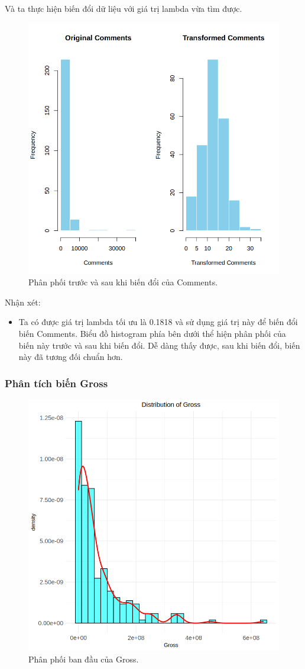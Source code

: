 Và ta thực hiện biến đổi dữ liệu với giá trị lambda vừa tìm được.
\begin{figure}[H]
    \centering
    \includegraphics[width=0.75\columnwidth]{csm_figures/comments_transformed_distribution.png}
    \caption{Phân phối trước và sau khi biến đổi của Comments.}
    \label{fig:comments_transformed_distribution}
\end{figure}
Nhận xét:
\begin{itemize}
    \item Ta có được giá trị lambda tối ưu là  0.1818 và sử dụng giá trị này để biến đổi biến Comments. Biểu đồ histogram phía bên dưới thể hiện phân phối của biến này trước và sau khi biến đổi. Dễ dàng thấy được, sau khi biến đổi, biến này đã tương đối chuẩn hơn.
\end{itemize}

\subsubsection{Phân tích biến Gross}

\begin{figure}[H]
    \centering
    \includegraphics[width=0.75\columnwidth]{csm_figures/gross_original_distribution.png}
    \caption{Phân phối ban đầu của Gross.}
    \label{fig:gross_original_distribution}
\end{figure}


